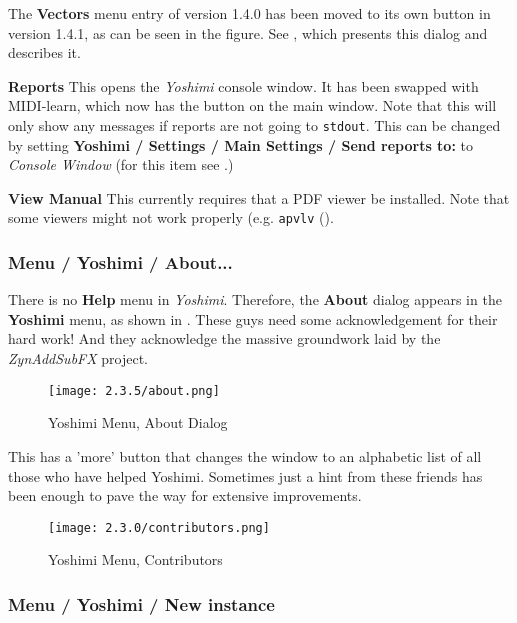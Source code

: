    The \textbf{Vectors} menu entry of version 1.4.0 has been moved to its own
   button in version 1.4.1, as can be seen in the figure.  See
   , which presents this dialog and
   describes it.

   \textbf{Reports} This opens the \textsl{Yoshimi} console window.
   It has been swapped with MIDI-learn, which now has the button on the main window.
   Note that this will only show any messages if reports are not going to
   \texttt{stdout}. This can be changed by setting \textbf{Yoshimi / Settings
   / Main Settings / Send reports to:} to \textsl{Console Window}
   (for this item see
   .)

   \textbf{View Manual} This currently requires that a PDF viewer
   be installed.
   Note that some viewers might not work properly
   (e.g. \texttt{apvlv} (\cite{apvlv}).

\subsubsection{Menu / Yoshimi / About...}
\label{subsubsec:menu_yoshimi_about}

   There is no \textbf{Help} menu in \textsl{Yoshimi}.  Therefore, the
   \textbf{About} dialog appears in the \textbf{Yoshimi} menu, as shown in
   .
   These guys need some acknowledgement for their hard work!
   And they acknowledge the massive groundwork laid by the
   \textsl{ZynAddSubFX} project.

\begin{figure}[H]
   \centering
   \texttt{[image: 2.3.5/about.png]}
   \caption{Yoshimi Menu, About Dialog}
   \label{fig:yoshimi_about_dialog}
\end{figure}
    This has a 'more' button that changes the window to an alphabetic list of
    all those who have helped Yoshimi. Sometimes just a hint from these friends
    has been enough to pave the way for extensive improvements.
\begin{figure}[H]
   \centering
   \texttt{[image: 2.3.0/contributors.png]}
   \caption{Yoshimi Menu, Contributors}
   \label{fig:yoshimi_contributors}
\end{figure}

\subsubsection{Menu / Yoshimi / New instance}
\label{subsubsec:menu_yoshimi_new_instance}

